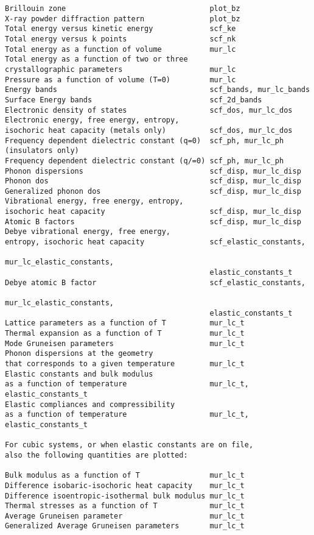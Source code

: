 \documentclass[12pt,a4paper]{article}
\begin{document}
\begin{verbatim}
Brillouin zone                                 plot_bz
X-ray powder diffraction pattern               plot_bz
Total energy versus kinetic energy             scf_ke
Total energy versus k points                   scf_nk
Total energy as a function of volume           mur_lc
Total energy as a function of two or three
crystallographic parameters                    mur_lc
Pressure as a function of volume (T=0)         mur_lc
Energy bands                                   scf_bands, mur_lc_bands
Surface Energy bands                           scf_2d_bands
Electronic density of states                   scf_dos, mur_lc_dos
Electronic energy, free energy, entropy,      
isochoric heat capacity (metals only)          scf_dos, mur_lc_dos
Frequency dependent dielectric constant (q=0)  scf_ph, mur_lc_ph
(insulators only)
Frequency dependent dielectric constant (q/=0) scf_ph, mur_lc_ph
Phonon dispersions                             scf_disp, mur_lc_disp
Phonon dos                                     scf_disp, mur_lc_disp
Generalized phonon dos                         scf_disp, mur_lc_disp
Vibrational energy, free energy, entropy,      
isochoric heat capacity                        scf_disp, mur_lc_disp
Atomic B factors                               scf_disp, mur_lc_disp
Debye vibrational energy, free energy, 
entropy, isochoric heat capacity               scf_elastic_constants, 
                                               mur_lc_elastic_constants,
                                               elastic_constants_t
Debye atomic B factor                          scf_elastic_constants,
                                               mur_lc_elastic_constants,
                                               elastic_constants_t
Lattice parameters as a function of T          mur_lc_t
Thermal expansion as a function of T           mur_lc_t 
Mode Gruneisen parameters                      mur_lc_t
Phonon dispersions at the geometry 
that corresponds to a given temperature        mur_lc_t
Elastic constants and bulk modulus
as a function of temperature                   mur_lc_t, elastic_constants_t
Elastic compliances and compressibility
as a function of temperature                   mur_lc_t, elastic_constants_t

For cubic systems, or when elastic constants are on file,
also the following quantities are plotted:

Bulk modulus as a function of T                mur_lc_t
Difference isobaric-isochoric heat capacity    mur_lc_t
Difference isoentropic-isothermal bulk modulus mur_lc_t
Thermal stresses as a function of T            mur_lc_t
Average Gruneisen parameter                    mur_lc_t
Generalized Average Gruneisen parameters       mur_lc_t     
\end{verbatim}
\end{document}
